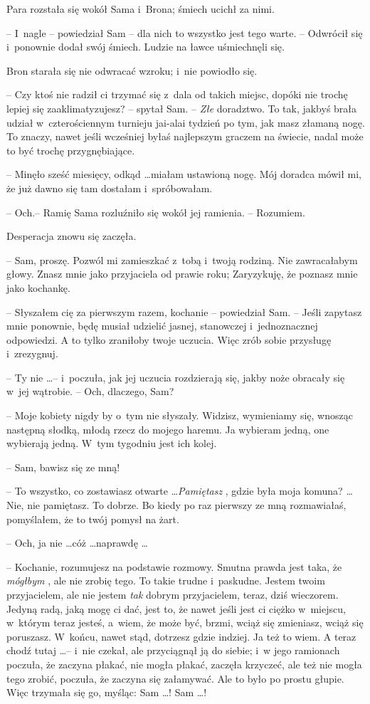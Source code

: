 \documentclass[oneside,polish,11pt,rmheadings]{mwbk}
\begin{document}
Para rozstała się wokół Sama i~Brona; śmiech ucichł za nimi. 

-- I~nagle -- powiedział Sam -- dla nich to wszystko jest tego warte. -- Odwrócił się i~ponownie dodał swój śmiech. Ludzie na ławce uśmiechnęli się. 

Bron starała się nie odwracać wzroku; i~nie powiodło się. 

-- Czy ktoś nie radził ci trzymać się z~dala od takich miejsc, dopóki nie trochę lepiej się zaaklimatyzujesz? -- spytał Sam. -- \textit{Złe }doradztwo. To tak, jakbyś brała udział w~czterościennym turnieju jai-alai tydzień po tym, jak masz złamaną nogę. To znaczy, nawet jeśli wcześniej byłaś najlepszym graczem na świecie, nadal może to być trochę przygnębiające. 

 -- Minęło sześć miesięcy, odkąd \ldots   miałam ustawioną nogę. Mój doradca mówił mi, że już dawno się tam dostałam i~spróbowałam. 

-- Och.-- Ramię Sama rozluźniło się wokół jej ramienia. -- Rozumiem.  

Desperacja znowu się zaczęła. 

-- Sam, proszę. Pozwól mi zamieszkać z~tobą i~twoją rodziną. Nie zawracałabym głowy. Znasz mnie jako przyjaciela od prawie roku; Zaryzykuję, że poznasz mnie jako kochankę. 

-- Słyszałem cię za pierwszym razem, kochanie -- powiedział Sam.  -- Jeśli zapytasz mnie ponownie, będę musiał udzielić jasnej, stanowczej i~jednoznacznej odpowiedzi. A to tylko zraniłoby twoje uczucia. Więc zrób sobie przysługę i~zrezygnuj. 

-- Ty nie  \ldots  -- i~poczuła, jak jej uczucia rozdzierają się, jakby noże obracały się w~jej wątrobie. -- Och, dlaczego, Sam? 

-- Moje kobiety nigdy by o~tym nie słyszały. Widzisz, wymieniamy się, wnosząc następną słodką, młodą rzecz do mojego haremu. Ja wybieram jedną, one wybierają jedną. W~tym tygodniu jest ich kolej. 

-- Sam, bawisz się ze mną! 

-- To wszystko, co zostawiasz otwarte \ldots   \textit{Pamiętasz }, gdzie była moja komuna?  \ldots  Nie, nie pamiętasz. To dobrze. Bo kiedy po raz pierwszy ze mną rozmawiałaś, pomyślałem, że to twój pomysł na żart. 

-- Och, ja nie \ldots  cóż \ldots  naprawdę \ldots  

-- Kochanie, rozumujesz na podstawie rozmowy. Smutna prawda jest taka, że \textit{mógłbym }, ale nie zrobię tego. To takie trudne i~paskudne. Jestem twoim przyjacielem, ale nie jestem \textit{tak }dobrym przyjacielem, teraz, dziś wieczorem. Jedyną radą, jaką mogę ci dać, jest to, że nawet jeśli jest ci ciężko w~miejscu, w~którym teraz jesteś, a~wiem, że może być, brzmi,  wciąż się zmieniasz, wciąż się poruszasz. W~końcu, nawet stąd, dotrzesz gdzie indziej. Ja też to wiem. A teraz chodź tutaj \ldots  -- i~nie czekał, ale przyciągnął ją do siebie; i~w jego ramionach poczuła, że zaczyna płakać, nie mogła płakać, zaczęła krzyczeć, ale też nie mogła tego zrobić, poczuła, że zaczyna się załamywać. Ale to było po prostu głupie. Więc trzymała się go, myśląc: Sam \ldots ! Sam \ldots ! 
\end{document}
